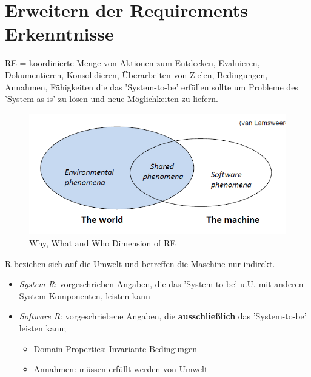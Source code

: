 \section{Erweitern der Requirements Erkenntnisse}
RE = koordinierte Menge von Aktionen zum Entdecken, Evaluieren, Dokumentieren, Konsolidieren, Überarbeiten von Zielen, Bedingungen, Annahmen, Fähigkeiten die das 'System-to-be' erfüllen sollte um Probleme des 'System-as-is' zu lösen und neue Möglichkeiten zu liefern.

\begin{figure}[h]
	\centering
	\includegraphics[scale=0.5]{img/re_world.png}
	\caption{Why, What and Who Dimension of RE}
	\label{re_world}
\end{figure}

R beziehen sich auf die Umwelt und betreffen die Maschine nur indirekt.
\begin{itemize}
	\item \textit{System R}: vorgeschrieben Angaben, die das 'System-to-be' u.U. mit anderen System Komponenten, leisten kann
	\item \textit{Software R}: vorgeschriebene Angaben, die \textbf{ausschließlich} das 'System-to-be' leisten kann;
	\begin{itemize}
		\item Domain Properties: Invariante Bedingungen 
		\item Annahmen: müssen erfüllt werden von Umwelt
	\end{itemize}
\end{itemize}

